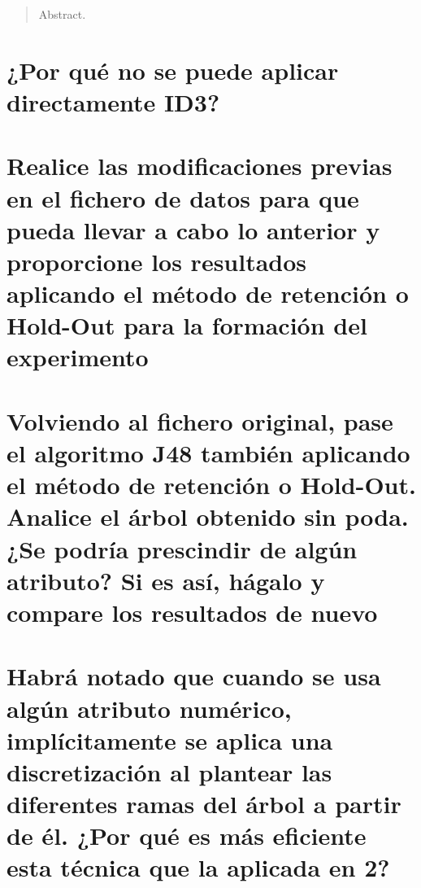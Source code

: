 \documentclass[10pt, a4paper,spanish]{article}
\begin{document}
	\maketitle %

	\thispagestyle{fancy} %



	\begin{abstract}
		\noindent Abstract.
	\end{abstract}



	\section{¿Por qué no se puede aplicar directamente ID3?}

		\paragraph{}


	\section{Realice las modificaciones previas en el fichero de datos para que pueda llevar a cabo lo anterior y proporcione los resultados aplicando el método de retención o Hold-Out para la formación del experimento}

		\paragraph{}


	\section{Volviendo al fichero original, pase el algoritmo J48 también aplicando el método de retención o Hold-Out. Analice el árbol obtenido sin poda. ¿Se podría prescindir de algún atributo? Si es así, hágalo y compare los resultados de nuevo}

		\paragraph{}


	\section{Habrá notado que cuando se usa algún atributo numérico, implícitamente se aplica una discretización al plantear las diferentes ramas del árbol a partir de él. ¿Por qué es más eficiente esta técnica que la aplicada en 2?}
\end{document}
